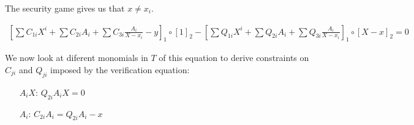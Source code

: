 \documentclass[runningheads,11pt]{llncs}
\begin{document}
The security game gives us that $x \neq x_{i}$.

\begin{align*}
  \left[\sum C_{1i} X^{i} + \sum C_{2i} A_{i} + \sum C_{3i} \frac{A_{i}}{X-x_{i}} - y\right]_{1} \circ [1]_{2} - \left[\sum Q_{1i} X^{i} + \sum Q_{2i} A_{i} + \sum Q_{3i} \frac{A_{i}}{X-x_{i}}\right]_{1} \circ [X-x]_{2} = 0
  \end{align*}

We now look at diferent monomials in $T$ of this equation to derive constraints on $C_{ji}$ and $Q_{ji}$ imposed by the verification equation:
\begin{itemize}
  \item[$A_{i}X$:] $Q_{2i} A_{i} X = 0$
        \item[$A_{i}$:] $C_{2i} A_{i} = Q_{2i}A_{i} - x$
\end{itemize}



\end{document}
